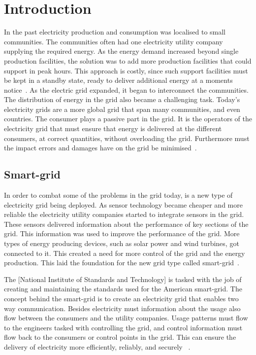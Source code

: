 \chapter{Introduction}

In the past electricity production and consumption was localised to small communities. The communities often had one electricity utility company supplying the required energy. As the energy demand increased beyond single production facilities, the solution was to add more production facilities that could support in peak hours. This approach is costly, since such support facilities must be kept in a standby state, ready to deliver additional energy at a moments notice~\citep{RefWorks:46}. As the electric grid expanded, it began to interconnect the communities. The distribution of energy in the grid also became a challenging task. Today's electricity grids are a more global grid that span many communities, and even countries. The consumer plays a passive part in the grid. It is the  operators of the electricity grid that must ensure that energy is delivered at the different consumers, at correct quantities, without overloading the grid. Furthermore must the impact errors and damages have on the grid be minimised~\citep{RefWorks:43}. 

\section{Smart-grid}
In order to combat some of the problems in the grid today, is a new type of electricity grid being deployed. As sensor technology became cheaper and more reliable the electricity utility companies started to integrate sensors in the grid. These sensors delivered information about the performance of key sections of the grid. This information was used to improve the performance of the grid. More types of energy producing devices, such as solar power and wind turbines, got connected to it. This created a need for more control of the grid and the energy production. This laid the foundation for the new grid type called smart-grid~\citep{RefWorks:43}.

The [National Institute of Standards and Technology] is tasked with the job of creating and maintaining the standards used for the American smart-grid. The concept behind the smart-grid is to create an electricity grid that enables two way communication. Besides electricity must information about the usage also flow between the consumers and the utility companies. Usage patterns must flow to the engineers tasked with controlling the grid, and control information must flow back to the consumers or control points in the grid. This can ensure the delivery of electricity more efficiently, reliably, and securely ~\citep{RefWorks:42}. 

